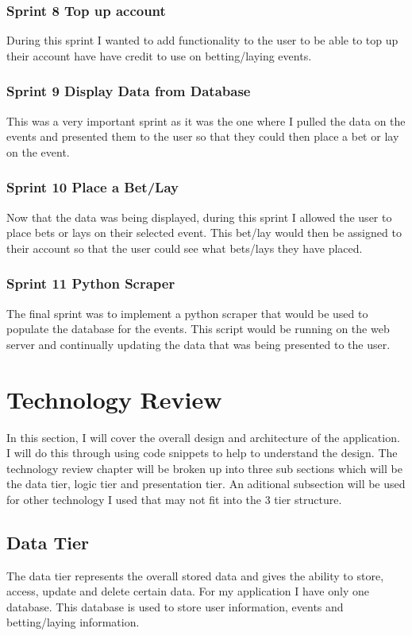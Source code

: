 \subsection{Sprint 8 Top up account}
During this sprint I wanted to add functionality to the user to be able to top up their account have have credit to use on betting/laying events.

\subsection{Sprint 9 Display Data from Database}
This was a very important sprint as it was the one where I pulled the data on the events and presented them to the user so that they could then place a bet or lay on the event.

\subsection{Sprint 10 Place a Bet/Lay}
Now that the data was being displayed, during this sprint I allowed the user to place bets or lays on their selected event. This bet/lay would then be assigned to their account so that the user could see what bets/lays they have placed.

\subsection{Sprint 11 Python Scraper}
The final sprint was to implement a python scraper that would be used to populate the database for the events. This script would be running on the web server and continually updating the data that was being presented to the user.

\chapter{Technology Review}
In this section, I will cover the overall design and architecture of the application. I will do this through using code snippets to help to understand the design. The technology review chapter will be broken up into three sub sections which will be the data tier, logic tier and presentation tier. An aditional subsection will be used for other technology I used that may not fit into the 3 tier structure.

\section{Data Tier}
The data tier represents the overall stored data and gives the ability to store, access, update and delete certain data. For my application I have only one database. This database is used to store user information, events and betting/laying information.

